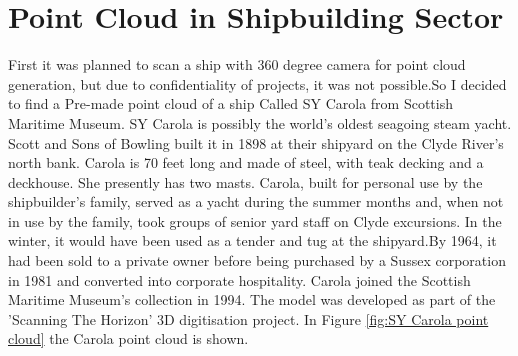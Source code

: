 \section{Point Cloud in Shipbuilding Sector}

First it was planned to scan a ship with 360 degree camera for point cloud generation, but due to confidentiality of projects, it was not possible.So I decided to find a Pre-made point cloud of a ship Called SY Carola from Scottish Maritime Museum. SY Carola is possibly the world's oldest seagoing steam yacht. Scott and Sons of Bowling built it in 1898 at their shipyard on the Clyde River's north bank. Carola is 70 feet long and made of steel, with teak decking and a deckhouse. She presently has two masts.
Carola, built for personal use by the shipbuilder's family, served as a yacht during the summer months and, when not in use by the family, took groups of senior yard staff on Clyde excursions. In the winter, it would have been used as a tender and tug at the shipyard.By 1964, it had been sold to a private owner before being purchased by a Sussex corporation in 1981 and converted into corporate hospitality.
Carola joined the Scottish Maritime Museum's collection in 1994.
The model was developed as part of the 'Scanning The Horizon' 3D digitisation project\cite{Carolaship}. In Figure \ref{fig:SY Carola point cloud} the Carola point cloud is shown. 

